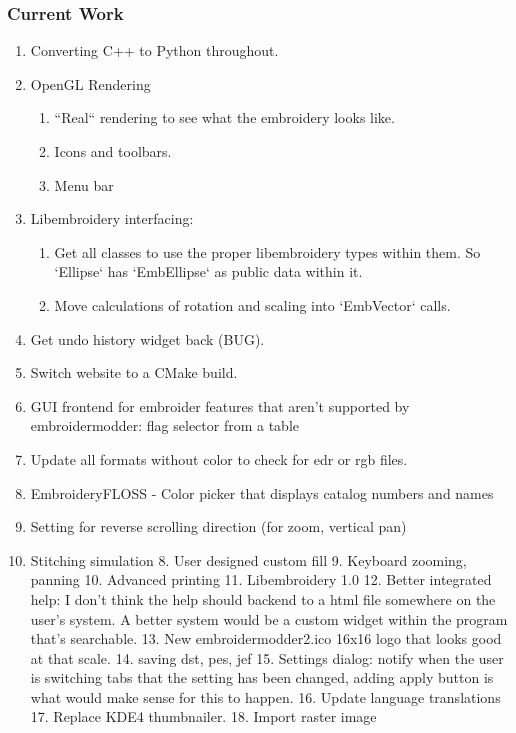 \documentclass[a4paper, 11pt]{report}
\begin{document}
\subsubsection{Current Work}

\begin{enumerate}
\item Converting C++ to Python throughout.
\item OpenGL Rendering
\begin{enumerate}
\item ``Real`` rendering to see what the embroidery looks like.
\item Icons and toolbars.
\item Menu bar
\end{enumerate}
\item Libembroidery interfacing:
\begin{enumerate}
\item Get all classes to use the proper libembroidery types within them.
       So `Ellipse` has `EmbEllipse` as public data within it.
\item Move calculations of rotation and scaling into `EmbVector` calls.
\end{enumerate}
\item Get undo history widget back (BUG).
\item Switch website to a CMake build.
\item GUI frontend for embroider features that aren't supported by embroidermodder: flag selector from a table
\item Update all formats without color to check for edr or rgb files.
\item EmbroideryFLOSS - Color picker that displays catalog numbers and names
\item Setting for reverse scrolling direction (for zoom, vertical pan)
\item Stitching simulation
8. User designed custom fill
9. Keyboard zooming, panning
10. Advanced printing
11. Libembroidery 1.0
12. Better integrated help: I don't think the help should backend to a html file somewhere on the user's system. A better system would be a custom widget within the program that's searchable.
13. New embroidermodder2.ico 16x16 logo that looks good at that scale.
14. saving dst, pes, jef
15. Settings dialog: notify when the user is switching tabs that the setting has been changed, adding apply button is what would make sense for this to happen.
16. Update language translations
17. Replace KDE4 thumbnailer.
18. Import raster image

\end{enumerate}
\end{document}
